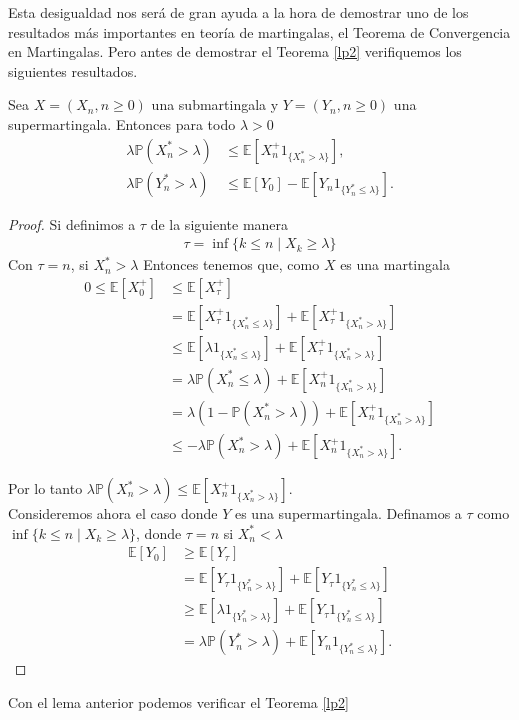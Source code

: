 Esta desigualdad nos será de gran ayuda a la hora de demostrar uno de los resultados más importantes en teoría de martingalas, el Teorema de Convergencia en Martingalas. Pero antes de demostrar el Teorema \ref{lp2} verifiquemos los siguientes resultados.

\begin{lemma}
\label{lemdes2}
Sea $X = (X_n, n \geq 0)$ una submartingala y $Y = (Y_n, n \geq 0)$ una supermartingala. Entonces para todo $\lambda > 0$
	\begin{align}
		\lambda  \mathbb{P}(X_n^{*} > \lambda) & \leq \mathbb{E}[X_n^{+} 1_{\{X_n^{*} > \lambda\}}] \label{aaj}, \\
		\lambda  \mathbb{P}(Y_n^{*} > \lambda) & \leq \mathbb{E}[Y_0] - \mathbb{E}[Y_n 1_{\{Y_n^{*} \leq \lambda\}}]. \label{aak}
	\end{align}
\end{lemma}
\begin{proof}
Si definimos a $\tau$ de la siguiente manera
	\begin{align*}
	\tau = \inf \{k \leq n \mid X_k \geq \lambda\}
	\end{align*}
Con $\tau = n$, si $X_n^{*} > \lambda$
Entonces tenemos que, como $X$ es una martingala
	\begin{align*}
	0 \leq \mathbb{E}[X_0^{+}] & \leq \mathbb{E}[X_{\tau}^{+}] \\
	& = \mathbb{E}[X_{\tau}^{+} 1_{\{X_n^{*} \leq \lambda\}}] + \mathbb{E}[X_{\tau}^{+} 1_{\{X_n^{*} > \lambda\}}] \\
	& \leq \mathbb{E}[\lambda  1_{\{X_n^{*} \leq \lambda\}}] + \mathbb{E}[X_{\tau}^{+} 1_{\{X_n^{*} > \lambda\}}] \\
	& = \lambda  \mathbb{P}(X_n^{*} \leq \lambda) + \mathbb{E}[X_n^{+} 1_{\{X_n^{*} > \lambda\}}] \\
	& = \lambda  (1 - \mathbb{P}(X_n^{*} > \lambda)) + \mathbb{E}[X_n^{+} 1_{\{X_n^{*} > \lambda\}}] \\
	& \leq - \lambda \mathbb{P}(X_n^{*} > \lambda) + \mathbb{E}[X_n^{+} 1_{\{X_n^{*} > \lambda\}}].
	\end{align*}

Por lo tanto $\lambda  \mathbb{P}(X_n^{*} > \lambda) \leq \mathbb{E}[X_n^{+} 1_{\{X_n^{*} > \lambda\}}]$. \\

Consideremos ahora el caso donde $Y$ es una supermartingala. Definamos a $\tau$ como $\inf \{k \leq n \mid X_k \geq \lambda\}$, donde $\tau = n$ si $X_n^{*} < \lambda$
	\begin{align*}
	\mathbb{E}[Y_0] & \geq \mathbb{E}[Y_{\tau}] \\
	& = \mathbb{E}[Y_{\tau} 1_{\{Y_n^{*} > \lambda\}}] + \mathbb{E}[Y_{\tau} 1_{\{Y_n^{*} \leq \lambda\}}] \\
	& \geq \mathbb{E}[\lambda  1_{\{Y_n^{*} > \lambda\}}] + \mathbb{E}[Y_{\tau} 1_{\{Y_n^{*} \leq \lambda\}}] \\
	& = \lambda  \mathbb{P}(Y_n^{*} > \lambda) + \mathbb{E}[Y_n 1_{\{Y_n^{*} \leq \lambda\}}].
	\end{align*}
\end{proof}
Con el lema anterior podemos verificar el Teorema \ref{lp2}

